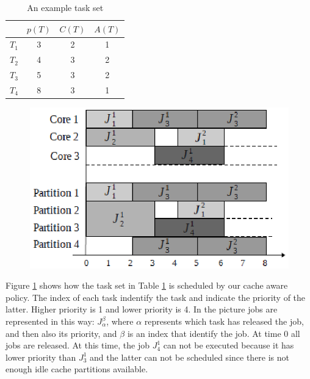 \begin{table}[htbp]
\begin{center}
\begin{tabular}{l|c|c|c}
	\hline
	& $p(T)$ & $C(T)$ & $A(T)$ \\ \hline
	$T_1$ & 3 & 2 & 1 \\ \hline
	$T_2$ & 4 & 3 & 2 \\ \hline
	$T_3$ & 5 & 3 & 2 \\ \hline
	$T_4$ & 8 & 3 & 1 \\ 
	\hline
\end{tabular}
\caption{An example task set}
\label{tab:cache_task_set}
\end{center}
\end{table}

\begin{figure}[htbp]
\centering
\includegraphics[width=\widefigure]{images/schedule.eps}
\caption{}
\label{fig:sched_example}
\end{figure}


Figure \ref{fig:sched_example} shows how the task set in Table \ref{tab:cache_task_set} is scheduled by our cache aware policy. The index of each task 
indentify the task and indicate the priority of the latter. Higher priority is 1 and lower priority is 4. In the picture jobs are represented in this way: 
$J_{\alpha}^\beta$, where $\alpha$ represents which task has released the job, and then also its priority, and $\beta$ is an index that identify the job.
At time 0 all jobs are released. At this time, the job $J_{4}^1$ can not be executed because it has lower priority than $J_{3}^1$ and the latter can not be
scheduled since there is not enough idle cache partitions available.

